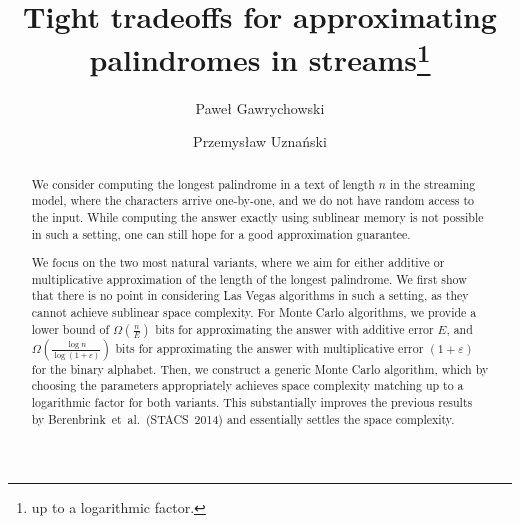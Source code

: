 \documentclass{article}[11pt,letter]
\newcommand{\aerr}{\ensuremath{E}}
\newcommand{\etal}{et~al.}
\begin{document}
\title{Tight tradeoffs for approximating palindromes in streams\footnote{up to a logarithmic factor.}}



\author[1]{Paweł Gawrychowski}
\author[2]{Przemysław Uznański}

\date{}

\maketitle

\begin{abstract}
We consider computing the longest palindrome in a text of length $n$ in the streaming model, where
the characters arrive one-by-one, and we do not have random access to the input. While 
computing the answer exactly using sublinear memory is not possible in such a setting, one can still hope for a good approximation guarantee.

We focus on the two most natural variants, where we aim for either additive or multiplicative approximation
of the length of the longest palindrome. We first show that there is no point in considering
Las Vegas algorithms in such a setting, as they cannot achieve sublinear space complexity.
For Monte Carlo algorithms, we provide a lower bound of $\Omega(\frac{n}{\aerr})$ bits for
approximating the answer with additive error $\aerr$, and  $\Omega(\frac{\log n}{\log(1+\varepsilon)})$ bits for 
approximating the answer with multiplicative error $(1+\varepsilon)$ for the binary alphabet.
Then, we construct a generic Monte Carlo algorithm, which by 
choosing the parameters appropriately achieves space complexity matching up to a logarithmic factor for
both variants.
This substantially improves the previous results by Berenbrink~\etal~(STACS~2014) and essentially settles
the space complexity.
\end{abstract}
\end{document}
